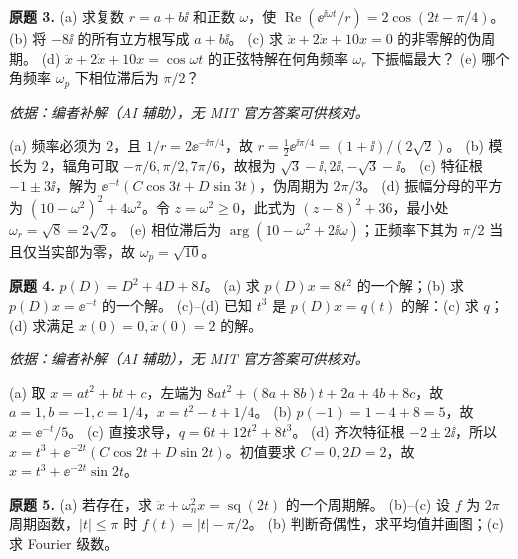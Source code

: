 \begin{exercise}\label{cw:final-3}\textbf{原题 3.}
(a) 求复数 $r=a+b\ii$ 和正数 $\omega$，使 $\operatorname{Re}(\ee^{\ii\omega t}/r)=2\cos(2t-\pi/4)$。
(b) 将 $-8\ii$ 的所有立方根写成 $a+b\ii$。
(c) 求 $\ddot x+2\dot x+10x=0$ 的非零解的伪周期。
(d) $\ddot x+2\dot x+10x=\cos\omega t$ 的正弦特解在何角频率 $\omega_r$ 下振幅最大？
(e) 哪个角频率 $\omega_p$ 下相位滞后为 $\pi/2$？
\end{exercise}
\begin{solution}
\textit{依据：编者补解（AI 辅助），无 MIT 官方答案可供核对。}\par
(a) 频率必须为 $2$，且 $1/r=2\ee^{-\ii\pi/4}$，故 $r=\tfrac12\ee^{\ii\pi/4}=(1+\ii)/(2\sqrt2)$。
(b) 模长为 $2$，辐角可取 $-\pi/6,\pi/2,7\pi/6$，故根为 $\sqrt3-\ii,2\ii,-\sqrt3-\ii$。
(c) 特征根 $-1\pm3\ii$，解为 $\ee^{-t}(C\cos3t+D\sin3t)$，伪周期为 $2\pi/3$。
(d) 振幅分母的平方为 $(10-\omega^2)^2+4\omega^2$。令 $z=\omega^2\ge0$，此式为 $(z-8)^2+36$，最小处 $\omega_r=\sqrt8=2\sqrt2$。
(e) 相位滞后为 $\arg(10-\omega^2+2\ii\omega)$；正频率下其为 $\pi/2$ 当且仅当实部为零，故 $\omega_p=\sqrt{10}$。
\end{solution}
\begin{exercise}\label{cw:final-4}\textbf{原题 4.} $p(D)=D^2+4D+8I$。
(a) 求 $p(D)x=8t^2$ 的一个解；(b) 求 $p(D)x=\ee^{-t}$ 的一个解。
(c)--(d) 已知 $t^3$ 是 $p(D)x=q(t)$ 的解：(c) 求 $q$；(d) 求满足 $x(0)=0,\dot x(0)=2$ 的解。
\end{exercise}
\begin{solution}
\textit{依据：编者补解（AI 辅助），无 MIT 官方答案可供核对。}\par
(a) 取 $x=at^2+bt+c$，左端为 $8at^2+(8a+8b)t+2a+4b+8c$，故 $a=1,b=-1,c=1/4$，$x=t^2-t+1/4$。
(b) $p(-1)=1-4+8=5$，故 $x=\ee^{-t}/5$。
(c) 直接求导，$q=6t+12t^2+8t^3$。
(d) 齐次特征根 $-2\pm2\ii$，所以 $x=t^3+\ee^{-2t}(C\cos2t+D\sin2t)$。初值要求 $C=0,2D=2$，故 $x=t^3+\ee^{-2t}\sin2t$。
\end{solution}
\begin{exercise}\label{cw:final-5}\textbf{原题 5.}
(a) 若存在，求 $\ddot x+\omega_n^2x=\operatorname{sq}(2t)$ 的一个周期解。
(b)--(c) 设 $f$ 为 $2\pi$ 周期函数，$|t|\le\pi$ 时 $f(t)=|t|-\pi/2$。
(b) 判断奇偶性，求平均值并画图；(c) 求 Fourier 级数。
\end{exercise}
